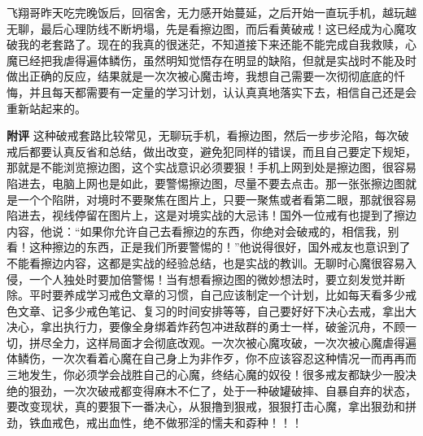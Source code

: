 \begin{case}
    飞翔哥昨天吃完晚饭后，回宿舍，无力感开始蔓延，之后开始一直玩手机，越玩越无聊，最后心理防线不断坍塌，先是看擦边图，而后看黄破戒！这已经成为心魔攻破我的老套路了。现在的我真的很迷茫，不知道接下来还能不能完成自我救赎，心魔已经把我虐得遍体鳞伤，虽然明知觉悟存在明显的缺陷，但就是实战时不能及时做出正确的反应，结果就是一次次被心魔击垮，我想自己需要一次彻彻底底的忏悔，并且每天都需要有一定量的学习计划，认认真真地落实下去，相信自己还是会重新站起来的。

    \textbf{附评} 这种破戒套路比较常见，无聊玩手机，看擦边图，然后一步步沦陷，每次破戒后都要认真反省和总结，做出改变，避免犯同样的错误，而且自己要定下规矩，那就是不能浏览擦边图，这个实战意识必须要狠！手机上网到处是擦边图，很容易陷进去，电脑上网也是如此，要警惕擦边图，尽量不要去点击。那一张张擦边图就是一个个陷阱，对境时不要聚焦在图片上，只要一聚焦或者看第二眼，那就很容易陷进去，视线停留在图片上，这是对境实战的大忌讳！国外一位戒有也提到了擦边内容，他说：“如果你允许自己去看擦边的东西，你绝对会破戒的，相信我，别看！这种擦边的东西，正是我们所要警惕的！”他说得很好，国外戒友也意识到了不能看擦边内容，这都是实战的经验总结，也是实战的教训。无聊时心魔很容易入侵，一个人独处时要加倍警惕！当有想看擦边图的微妙想法时，要立刻发觉并断除。平时要养成学习戒色文章的习惯，自己应该制定一个计划，比如每天看多少戒色文章、记多少戒色笔记、复习的时间安排等等，自己要好好下决心去戒，拿出大决心，拿出执行力，要像全身绑着炸药包冲进敌群的勇士一样，破釜沉舟，不顾一切，拼尽全力，这样局面才会彻底改观。一次次被心魔攻破，一次次被心魔虐得遍体鳞伤，一次次看着心魔在自己身上为非作歹，你不应该容忍这种情况一而再再而三地发生，你必须学会战胜自己的心魔，终结心魔的奴役！很多戒友都缺少一股决绝的狠劲，一次次破戒都变得麻木不仁了，处于一种破罐破摔、自暴自弃的状态，要改变现状，真的要狠下一番决心，从狠撸到狠戒，狠狠打击心魔，拿出狠劲和拼劲，铁血戒色，戒出血性，绝不做邪淫的懦夫和孬种！！！
\end{case}

